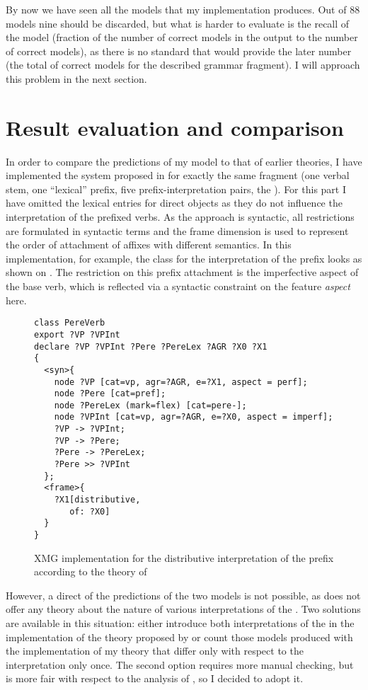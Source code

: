 By now we have seen all the models that my implementation produces. Out of 88 models nine should be discarded, but what is harder to evaluate is the recall of the model (fraction of the number of correct models in the output to the number of correct models), as there is no standard that would provide the later number (the total of correct models for the described grammar fragment). I will approach this problem in the next section.

\section{Result evaluation and comparison}
In order to compare the predictions of my model to that of earlier theories, I have implemented the system proposed in \citet{Tatevosov:09} for exactly the same fragment (one verbal stem, one ``lexical'' prefix, five prefix-interpretation pairs, the ). For this part I have omitted the lexical entries for direct objects as they do not influence the interpretation of the prefixed verbs. As the approach is syntactic, all restrictions are formulated in syntactic terms and the frame dimension is used to represent the order of attachment of affixes with different semantics. In this implementation, for example, the class for the  interpretation of the prefix  looks as shown on . The restriction on this prefix attachment is the imperfective aspect of the base verb, which is reflected via a syntactic constraint on the feature \textit{aspect} here.

\begin{figure}
\begin{lstlisting}[style=xmg]
class PereVerb
export ?VP ?VPInt 
declare ?VP ?VPInt ?Pere ?PereLex ?AGR ?X0 ?X1 
{
  <syn>{
    node ?VP [cat=vp, agr=?AGR, e=?X1, aspect = perf];
    node ?Pere [cat=pref];
    node ?PereLex (mark=flex) [cat=pere-];
    node ?VPInt [cat=vp, agr=?AGR, e=?X0, aspect = imperf];
    ?VP -> ?VPInt;
    ?VP -> ?Pere;
    ?Pere -> ?PereLex;
    ?Pere >> ?VPInt
  };
  <frame>{
    ?X1[distributive,
       of: ?X0]
  }
}
\end{lstlisting}
\caption{XMG implementation for the distributive interpretation of the prefix  according to the theory of \citet{Tatevosov:09}\label{xmg:Tat:pere}}
\end{figure}

However, a direct  of the predictions of the two models is not possible, as \citet{Tatevosov:09} does not offer any theory about the nature of various interpretations of the . Two solutions are available in this situation: either introduce both interpretations of the  in the implementation of the theory proposed by \citet{Tatevosov:09} or count those models produced with the implementation of my theory that differ only with respect to the interpretation only once. The second option requires more manual checking, but is more fair with respect to the analysis of \citet{Tatevosov:09}, so I decided to adopt it.


